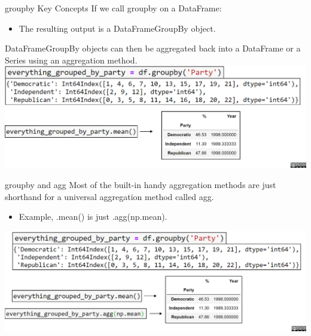 \documentclass[aspectratio=169]{../latex_main/tntbeamer}  %
\begin{document}
    
    \begin{frame}{groupby Key Concepts}
        If we call groupby on a DataFrame:
        \begin{itemize}
            \item The resulting output is a DataFrameGroupBy object.
        \end{itemize}
        DataFrameGroupBy objects can then be aggregated back into a DataFrame or a Series using an aggregation method.
        \includegraphics[scale=.35]{Bild43}
    \end{frame}
    
    
    
    \begin{frame}{groupby and agg}
        Most of the built-in handy aggregation methods are just shorthand for a universal aggregation method called agg.
        \begin{itemize}
            \item Example, .mean() is just .agg(np.mean).
        \end{itemize}
        \includegraphics[scale=.4]{Bild44}
    \end{frame}
    
\end{document}
